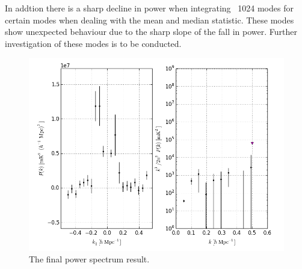 \documentclass[twocolumn,numberedappendix]{emulateapj} \shorttitle{PSA64}
\begin{document}
In addtion there is a sharp decline in power when integrating ~1024 modes for
certain modes when dealing with the mean and median statistic. These modes show
unexpected behaviour due to the sharp slope of the fall in power. Further
investigation of these modes is to be conducted.
%
\begin{figure}[h!]\centering
\includegraphics[width=1.5\columnwidth, height=1\columnwidth]{plots/pk_k3pk.png}
\caption{The final power spectrum result.}
\label{fig:final_pspec}
\end{figure}
\end{document}
